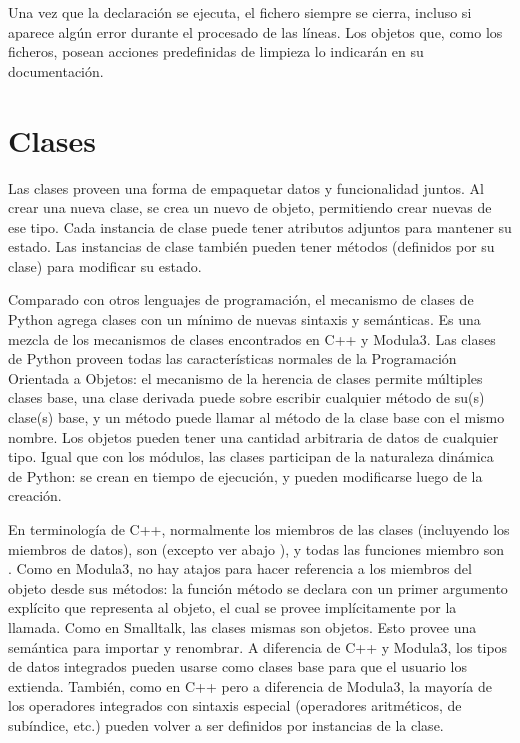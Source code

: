 \documentclass[a5paper,10pt,spanish]{sphinxmanual}
\begin{document}
\sphinxAtStartPar
Una vez que la declaración se ejecuta, el fichero  siempre se cierra, incluso si aparece algún error durante el procesado de las líneas.  Los objetos que, como los ficheros, posean acciones predefinidas de limpieza lo indicarán en su documentación.


\chapter{Clases}
\label{\detokenize{tutorial/classes:classes}}\label{\detokenize{tutorial/classes:tut-classes}}\label{\detokenize{tutorial/classes::doc}}
\sphinxAtStartPar
Las clases proveen una forma de empaquetar datos y funcionalidad juntos. Al crear una nueva clase, se crea un nuevo  de objeto, permitiendo crear nuevas  de ese tipo. Cada instancia de clase puede tener atributos adjuntos para mantener su estado. Las instancias de clase también pueden tener métodos (definidos por su clase) para modificar su estado.

\sphinxAtStartPar
Comparado con otros lenguajes de programación, el mecanismo de clases de Python agrega clases con un mínimo de nuevas sintaxis y semánticas.  Es una mezcla de los mecanismos de clases encontrados en C++ y Modula\sphinxhyphen{}3.  Las clases de Python proveen todas las características normales de la Programación Orientada a Objetos: el mecanismo de la herencia de clases permite múltiples clases base, una clase derivada puede sobre escribir cualquier método de su(s) clase(s) base, y un método puede llamar al método de la clase base con el mismo nombre.  Los objetos pueden tener una cantidad arbitraria de datos de cualquier tipo.  Igual que con los módulos, las clases participan de la naturaleza dinámica de Python: se crean en tiempo de ejecución, y pueden modificarse luego de la creación.

\sphinxAtStartPar
En terminología de C++, normalmente los miembros de las clases (incluyendo los miembros de datos), son  (excepto ver abajo {\hyperref[\detokenize{tutorial/classes:tut-private}]{}}), y todas las funciones miembro son .  Como en Modula\sphinxhyphen{}3, no hay atajos para hacer referencia a los miembros del objeto desde sus métodos: la función método se declara con un primer argumento explícito que representa al objeto, el cual se provee implícitamente por la llamada.  Como en Smalltalk, las clases mismas son objetos.  Esto provee una semántica para importar y renombrar.  A diferencia de C++ y Modula\sphinxhyphen{}3, los tipos de datos integrados pueden usarse como clases base para que el usuario los extienda.  También, como en C++ pero a diferencia de Modula\sphinxhyphen{}3, la mayoría de los operadores integrados con sintaxis especial (operadores aritméticos, de sub\sphinxhyphen{}índice, etc.) pueden volver a ser definidos por instancias de la clase.
\end{document}
